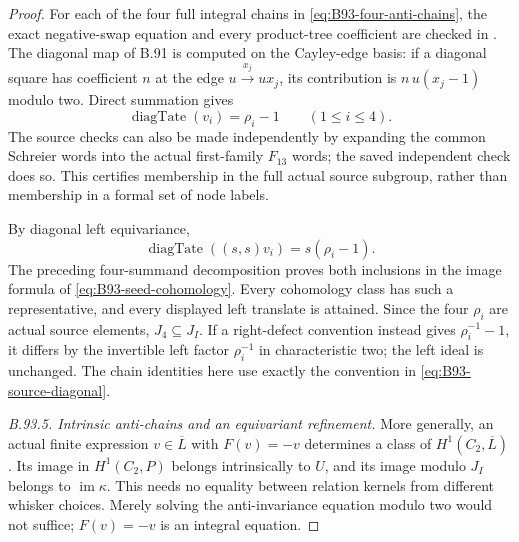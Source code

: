 \begin{proof}
For each of the four full integral chains in
\eqref{eq:B93-four-anti-chains}, the exact negative-swap equation
and every product-tree coefficient are checked in
.
The diagonal map of B.91 is computed on the Cayley-edge basis:
if a diagonal square has coefficient $n$ at the edge
$u\xrightarrow{x_j}ux_j$, its contribution is
$n\,u(x_j-1)$ modulo two. Direct summation gives
\begin{equation}\label{eq:B93-source-diagonal}
                     \operatorname{diagTate}(v_i)=\rho_i-1
                     \qquad(1\leq i\leq4).
\end{equation}
The source checks can also be made independently by expanding the
common Schreier words into the actual first-family $F_{13}$ words;
the saved independent check does so. This certifies membership in
the full actual source subgroup, rather than membership in a
formal set of node labels.

By diagonal left equivariance,
\[
 \operatorname{diagTate}((s,s)v_i)=s(\rho_i-1).
\]
The preceding four-summand decomposition proves both inclusions
in the image formula of \eqref{eq:B93-seed-cohomology}. Every
cohomology class has such a representative, and every displayed
left translate is attained. Since the four $\rho_i$ are actual
source elements, $J_4\subseteq J_I$. If a right-defect convention
instead gives $\rho_i^{-1}-1$, it differs by the invertible left
factor $\rho_i^{-1}$ in characteristic two; the left ideal is
unchanged. The chain identities here use exactly the convention
in \eqref{eq:B93-source-diagonal}.

\emph{B.93.5. Intrinsic anti-chains and an equivariant refinement.}
More generally, an actual finite expression $v\in\overline L$
with $F(v)=-v$ determines a class of $H^1(C_2,\overline L)$.
Its image in $H^1(C_2,P)$ belongs intrinsically to $U$, and
its image modulo $J_I$ belongs to $\operatorname{im}\kappa$.
This needs no equality between relation kernels from different
whisker choices. Merely solving the anti-invariance equation
modulo two would not suffice; $F(v)=-v$ is an integral equation.


\end{proof}
